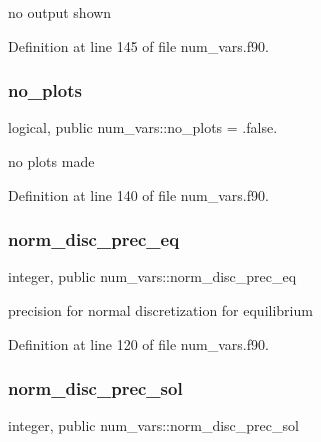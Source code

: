 no output shown 



Definition at line 145 of file num\+\_\+vars.\+f90.

\mbox{\label{namespacenum__vars_afe223f0c9580de8bf52d2cedc2ab2ee8}} 
\subsubsection{\texorpdfstring{no\+\_\+plots}{no\_plots}}
{\footnotesize\ttfamily logical, public num\+\_\+vars\+::no\+\_\+plots = .false.}



no plots made 



Definition at line 140 of file num\+\_\+vars.\+f90.

\mbox{\label{namespacenum__vars_a9554337420be2ea367f2a6bc71bb654f}} 
\subsubsection{\texorpdfstring{norm\+\_\+disc\+\_\+prec\+\_\+eq}{norm\_disc\_prec\_eq}}
{\footnotesize\ttfamily integer, public num\+\_\+vars\+::norm\+\_\+disc\+\_\+prec\+\_\+eq}



precision for normal discretization for equilibrium 



Definition at line 120 of file num\+\_\+vars.\+f90.

\mbox{\label{namespacenum__vars_a125bbc64ad3fac6752bc64e4222c6f50}} 
\subsubsection{\texorpdfstring{norm\+\_\+disc\+\_\+prec\+\_\+sol}{norm\_disc\_prec\_sol}}
{\footnotesize\ttfamily integer, public num\+\_\+vars\+::norm\+\_\+disc\+\_\+prec\+\_\+sol}



